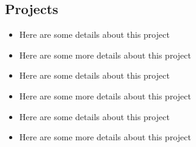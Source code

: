 \documentclass{mxresume}
\begin{document}
\begin{minipage}[t]{0.7\textwidth}
\begin{resumebody}
\section*{Projects}
\begin{itemize}[leftmargin=5mm]
\setlength{\itemsep}{0mm}
\item Here are some details about this project
\item Here are some more details about this project
\end{itemize}
\begin{itemize}[leftmargin=5mm]
\setlength{\itemsep}{0mm}
\item Here are some details about this project
\item Here are some more details about this project
\end{itemize}
\begin{itemize}[leftmargin=5mm]
\setlength{\itemsep}{0mm}
\item Here are some details about this project
\item Here are some more details about this project
\end{itemize}
\textit{} \\[8cm] %
\end{resumebody}
\end{minipage}
\hfill
\end{document}
